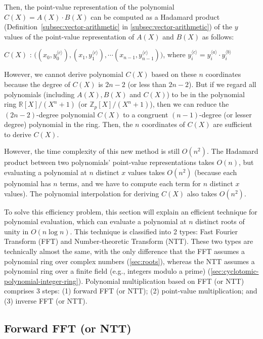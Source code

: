 Then, the point-value representation of the polynomial $C(X) = A(X) \cdot B(X)$ can be computed as a Hadamard product (Definition~\ref*{subsec:vector-arithmetic} in \autoref{subsec:vector-arithmetic}) of the $y$ values of the point-value representation of $A(X)$ and $B(X)$ as follows:

$C(X)$ : $\bm ( ({x}_0, {y}_0^{\langle c \rangle}), ({x}_1, {y}_1^{\langle c \rangle}), \cdots ({x}_{n-1}, {y}_{n-1}^{\langle c \rangle}) \bm )$, where ${y}_i^{\langle c \rangle} = {y}_i^{\langle a \rangle} \cdot {y}_i^{\langle b \rangle}$

However, we cannot derive polynomial $C(X)$ based on these $n$ coordinates because the degree of $C(X)$ is $2n-2$ (or less than $2n-2$). But if we regard all polynomials (including $A(X), B(X)$ and $C(X)$) to be in the polynomial ring $\mathbb{R}[X]/ (X^n + 1)$ (or $\mathbb{Z}_p[X]/(X^n + 1)$), then we can reduce the $(2n-2)$-degree polynomial $C(X)$ to a congruent $(n-1)$-degree (or lesser degree) polynomial in the ring. Then, the $n$ coordinates of $C(X)$ are sufficient to derive $C(X)$. 

However, the time complexity of this new method is still $O(n^2)$. The Hadamard product between two polynomials' point-value representations takes $O(n)$, but evaluating a polynomial at $n$ distinct $x$ values takes $O(n^2)$ (because each polynomial has $n$ terms, and we have to compute each term for $n$ distinct $x$ values). The polynomial interpolation for deriving $C(X)$ also takes $O(n^2)$. 

To solve this efficiency problem, this section will explain an efficient technique for polynomial evaluation, which can evaluate a polynomial at $n$ distinct roots of unity in $O(n \log n)$. This technique is classified into 2 types: Fast Fourier Transform (FFT) and Number-theoretic Transform (NTT). These two types are technically almost the same, with the only difference that the FFT assumes a polynomial ring over complex numbers (\autoref{sec:roots}), whereas the NTT assumes a polynomial ring over a finite field (e.g., integers modulo a prime) (\autoref{sec:cyclotomic-polynomial-integer-ring}). Polynomial multiplication based on FFT (or NTT) comprises 3 steps: (1) forward FFT (or NTT); (2) point-value multiplication; and (3) inverse FFT (or NTT). 

\subsection{Forward FFT (or NTT)}
\label{subsec:ntt-forward}

